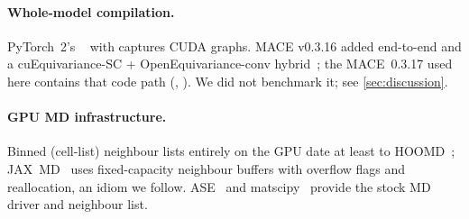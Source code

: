 \paragraph{Whole-model compilation.}
PyTorch~2's ~\cite{ansel2024pytorch2} with  captures CUDA graphs. MACE v0.3.16 added end-to-end  and a cuEquivariance-SC + OpenEquivariance-conv hybrid~\cite{mace_v0316}; the MACE~0.3.17 used here contains that code path (, ). We did not benchmark it; see \cref{sec:discussion}.

\paragraph{GPU MD infrastructure.}
Binned (cell-list) neighbour lists entirely on the GPU date at least to HOOMD~\cite{anderson2008hoomd}; JAX~MD~\cite{schoenholz2020jaxmd} uses fixed-capacity neighbour buffers with overflow flags and reallocation, an idiom we follow. ASE~\cite{larsen2017ase} and matscipy~\cite{matscipy} provide the stock MD driver and neighbour list.

